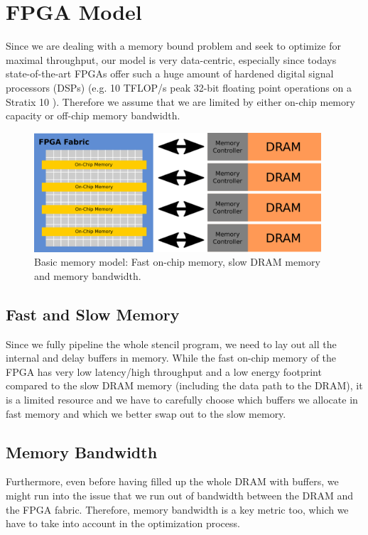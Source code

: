 \section{FPGA Model}
Since we are dealing with a memory bound problem and seek to optimize for maximal throughput, our model is very data-centric, especially since todays state-of-the-art FPGAs offer such a huge amount of hardened digital signal processors (DSPs) (e.g. 10 TFLOP/s peak 32-bit floating point operations on a Stratix 10 \label{label25}). Therefore we assume that we are limited by either on-chip memory capacity or off-chip memory bandwidth.
\begin{figure}[h]
	\centering
	\includegraphics[height=12em]{drawings/optimizer-memory-system.png}
	\caption{Basic memory model: Fast on-chip memory, slow DRAM memory and memory bandwidth.}
	\label{fig:optimizer-memory-system}
\end{figure}


\subsection{Fast and Slow Memory}
Since we fully pipeline the whole stencil program, we need to lay out all the internal and delay buffers in memory. While the fast on-chip memory of the FPGA has very low latency/high throughput and a low energy footprint compared to the slow DRAM memory (including the data path to the DRAM), it is a limited resource and we have to carefully choose which buffers we allocate in fast memory and which we better swap out to the slow memory.


\subsection{Memory Bandwidth}
Furthermore, even before having filled up the whole DRAM with buffers, we might run into the issue that we run out of bandwidth between the DRAM and the FPGA fabric. Therefore, memory bandwidth is a key metric too, which we have to take into account in the optimization process.




